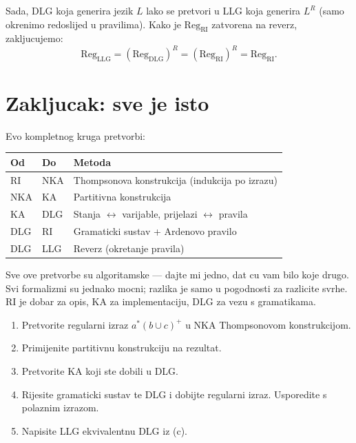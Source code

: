 Sada, DLG koja generira jezik $L$ lako se pretvori u LLG koja generira
$L^R$ (samo okrenimo redoslijed u pravilima). Kako je $\mathrm{Reg_{RI}}$
zatvorena na reverz, zakljucujemo:
\[
  \mathrm{Reg_{LLG}} = (\mathrm{Reg_{DLG}})^R = (\mathrm{Reg_{RI}})^R = \mathrm{Reg_{RI}}.
\]

\section{Zakljucak: sve je isto}

Evo kompletnog kruga pretvorbi:

\begin{center}
\renewcommand{\arraystretch}{1.6}
\begin{tabular}{lll}
\hline
\textbf{Od} & \textbf{Do} & \textbf{Metoda} \\
\hline
RI & NKA & Thompsonova konstrukcija (indukcija po izrazu) \\
NKA & KA & Partitivna konstrukcija \\
KA & DLG & Stanja $\leftrightarrow$ varijable, prijelazi $\leftrightarrow$ pravila \\
DLG & RI & Gramaticki sustav + Ardenovo pravilo \\
DLG & LLG & Reverz (okretanje pravila) \\
\hline
\end{tabular}
\end{center}

\begin{kljucno}
Sve ove pretvorbe su algoritamske --- dajte mi jedno, dat cu vam
bilo koje drugo. Svi formalizmi su jednako mocni; razlika je samo
u pogodnosti za razlicite svrhe. RI je dobar za opis, KA za
implementaciju, DLG za vezu s gramatikama.
\end{kljucno}

\begin{zadatak}
\begin{enumerate}[label=(\alph*), itemsep=4pt]
  \item Pretvorite regularni izraz $a^*(b \cup c)^+$ u NKA
        Thompsonovom konstrukcijom.
  \item Primijenite partitivnu konstrukciju na rezultat.
  \item Pretvorite KA koji ste dobili u DLG.
  \item Rijesite gramaticki sustav te DLG i dobijte regularni izraz.
        Usporedite s polaznim izrazom.
  \item Napisite LLG ekvivalentnu DLG iz (c).
\end{enumerate}
\end{zadatak}

